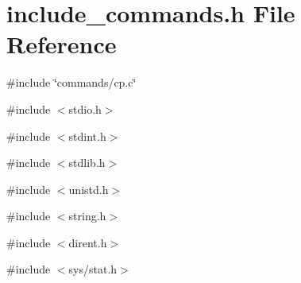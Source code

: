\section{include\_\-commands.h File Reference}
\label{include__commands_8h}
{\ttfamily \#include \char`\"{}commands/cp.c\char`\"{}}\par
{\ttfamily \#include $<$stdio.h$>$}\par
{\ttfamily \#include $<$stdint.h$>$}\par
{\ttfamily \#include $<$stdlib.h$>$}\par
{\ttfamily \#include $<$unistd.h$>$}\par
{\ttfamily \#include $<$string.h$>$}\par
{\ttfamily \#include $<$dirent.h$>$}\par
{\ttfamily \#include $<$sys/stat.h$>$}\par
